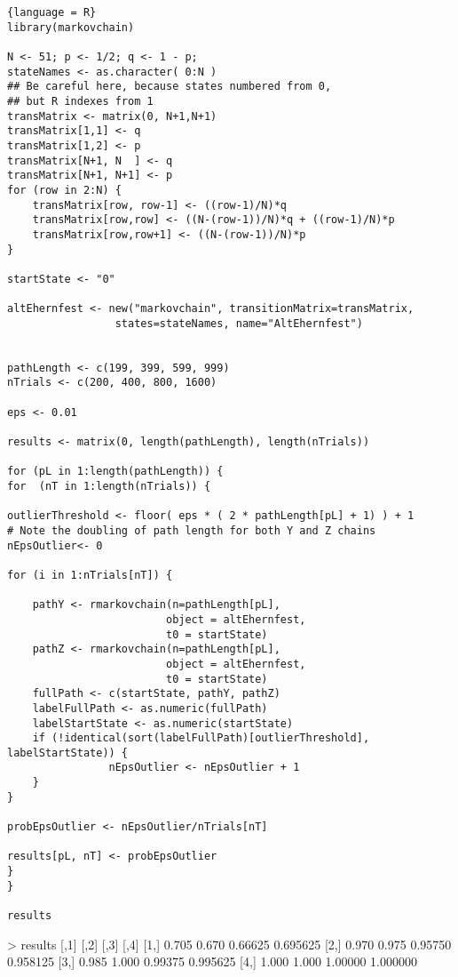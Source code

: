 \documentclass[12pt]{article}
\begin{document}
\begin{solution}

\begin{lstlisting}{language = R}
library(markovchain)

N <- 51; p <- 1/2; q <- 1 - p;
stateNames <- as.character( 0:N )
## Be careful here, because states numbered from 0,
## but R indexes from 1
transMatrix <- matrix(0, N+1,N+1)
transMatrix[1,1] <- q
transMatrix[1,2] <- p
transMatrix[N+1, N  ] <- q
transMatrix[N+1, N+1] <- p
for (row in 2:N) {
    transMatrix[row, row-1] <- ((row-1)/N)*q
    transMatrix[row,row] <- ((N-(row-1))/N)*q + ((row-1)/N)*p
    transMatrix[row,row+1] <- ((N-(row-1))/N)*p
}

startState <- "0"

altEhernfest <- new("markovchain", transitionMatrix=transMatrix,
                 states=stateNames, name="AltEhernfest")


pathLength <- c(199, 399, 599, 999)
nTrials <- c(200, 400, 800, 1600)

eps <- 0.01

results <- matrix(0, length(pathLength), length(nTrials))

for (pL in 1:length(pathLength)) {
for  (nT in 1:length(nTrials)) {

outlierThreshold <- floor( eps * ( 2 * pathLength[pL] + 1) ) + 1
# Note the doubling of path length for both Y and Z chains
nEpsOutlier<- 0

for (i in 1:nTrials[nT]) {
            
    pathY <- rmarkovchain(n=pathLength[pL],
                         object = altEhernfest,
                         t0 = startState)
    pathZ <- rmarkovchain(n=pathLength[pL],
                         object = altEhernfest,
                         t0 = startState)
    fullPath <- c(startState, pathY, pathZ)
    labelFullPath <- as.numeric(fullPath)
    labelStartState <- as.numeric(startState)
    if (!identical(sort(labelFullPath)[outlierThreshold], labelStartState)) {
                nEpsOutlier <- nEpsOutlier + 1
    }
}

probEpsOutlier <- nEpsOutlier/nTrials[nT]

results[pL, nT] <- probEpsOutlier
}
}

results
\end{lstlisting}

\begin{verbatim*}
  > results
      [,1]  [,2]    [,3]     [,4]
[1,] 0.705 0.670 0.66625 0.695625
[2,] 0.970 0.975 0.95750 0.958125
[3,] 0.985 1.000 0.99375 0.995625
[4,] 1.000 1.000 1.00000 1.000000
\end{verbatim*}

\end{solution}
\end{document}
